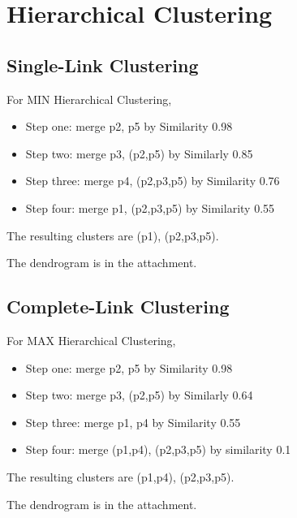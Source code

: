 \documentclass[11pt,a4paper]{article}
\begin{document}
\newpage
\section{Hierarchical Clustering}
\subsection{Single-Link Clustering}
For MIN Hierarchical Clustering,
\begin{itemize}
    \item{Step one: merge p2, p5 by Similarity 0.98}
    \item{Step two: merge p3, (p2,p5) by Similarly 0.85}
    \item{Step three: merge p4, (p2,p3,p5) by Similarity 0.76}
    \item{Step four: merge p1, (p2,p3,p5) by Similarity 0.55}
\end{itemize}

The resulting clusters are (p1), (p2,p3,p5). 

The dendrogram is in the attachment.

\subsection{Complete-Link Clustering}
For MAX Hierarchical Clustering,
\begin{itemize}
    \item{Step one: merge p2, p5 by Similarity 0.98}
    \item{Step two: merge p3, (p2,p5) by Similarly 0.64}
    \item{Step three: merge p1, p4 by Similarity 0.55}
    \item{Step four: merge (p1,p4), (p2,p3,p5) by similarity 0.1}
\end{itemize}

The resulting clusters are (p1,p4), (p2,p3,p5).

The dendrogram is in the attachment.


\end{document}
